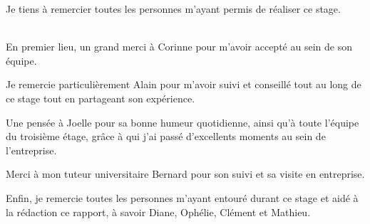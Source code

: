 Je tiens à remercier toutes les personnes m'ayant permis de réaliser ce stage.\\~

En premier lieu, un grand merci à Corinne  pour m'avoir accepté au sein de son équipe.

Je remercie particulièrement Alain  pour m'avoir suivi et conseillé tout au long de ce stage tout en partageant son expérience.

Une pensée à Joelle  pour sa bonne humeur quotidienne, ainsi qu'à toute l'équipe du troisième étage, grâce à qui j'ai passé d'excellents moments au sein de l'entreprise.

Merci à mon tuteur universitaire Bernard  pour son suivi et sa visite en entreprise.

Enfin, je remercie toutes les personnes m'ayant entouré durant ce stage et aidé à la rédaction ce rapport, à savoir Diane, Ophélie, Clément et Mathieu.
